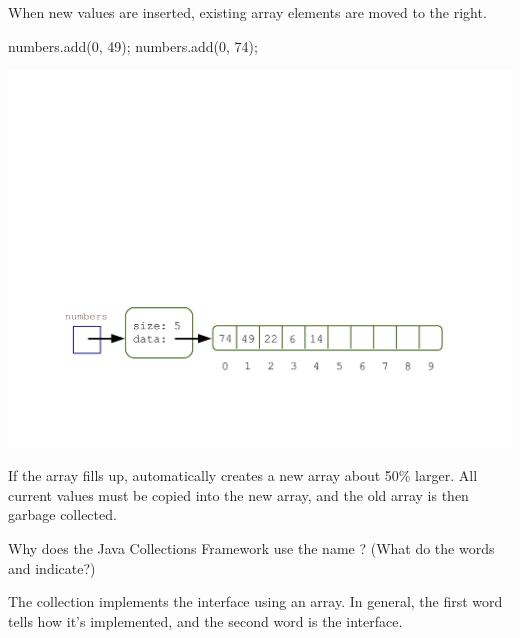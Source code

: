 When new values are inserted, existing array elements are moved to the right.

\vspace{1ex}
\begin{minipage}{0.35\linewidth}
\begin{javalst}
    numbers.add(0, 49);
    numbers.add(0, 74);
\end{javalst}
\end{minipage}
\hfill
\begin{minipage}{0.63\linewidth}
\includegraphics[scale=0.45]{figs/array3.pdf}
\end{minipage}
\vspace{1ex}

If the array fills up,  automatically creates a new array about 50\% larger.
All current values must be copied into the new array, and the old array is then garbage collected.




\Q Why does the Java Collections Framework use the name ?
(What do the words  and  indicate?)

\begin{answer}
The  collection implements the  interface using an array.
In general, the first word tells how it's implemented, and the second word is the interface.
\end{answer}


%


